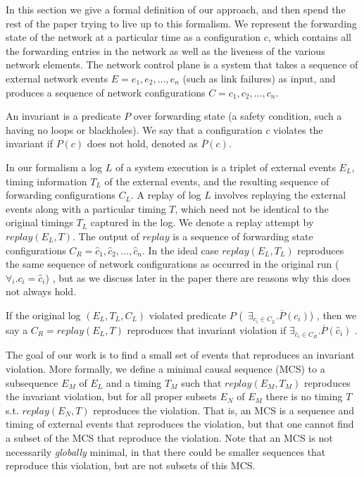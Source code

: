 In this section we give a formal definition of our approach, and then spend the rest of the paper trying to live up to this formalism.  We represent the forwarding state of the network
at a particular time as a configuration $c$, which contains all the forwarding
entries in the network
as well as the liveness of the various network elements.
The network control plane is a system that takes a sequence of
external network events $E = e_1,e_2,\dots,e_n$  (such as link failures) as input,
and produces a sequence of network configurations
$C = c_1,c_2,\dots,c_n$.

An invariant is a predicate $P$ over forwarding state (a safety
condition, such a having no loops or blackholes). We say that a configuration
$c$ violates the invariant if $P(c)$ does not
hold, denoted as $\overline{P}(c)$.

In our formalism a log $L$ of a system execution is a triplet of external events $E_L$,
timing information $T_L$ of the external events, and the resulting sequence of forwarding
configurations $C_L$.
A replay of log $L$ involves replaying the external events along with a
particular timing $T$,
which need not be identical to the original timings $T_L$  captured in the log.
We denote a replay attempt by $replay(E_L,T)$.
The output of $replay$ is a sequence of forwarding state configurations
$C_R = \hat{c}_1,\hat{c}_2,\dots,\hat{c}_n$. In the ideal case $replay(E_L,T_L)$ reproduces the same
sequence of network configurations as occurred in the original run
(\ie~$\forall_i. c_i = \hat{c}_i$) , but as we discuss later in the paper there are reasons why
this does not always hold.

If the original log $(E_L, T_L, C_L)$ violated predicate $P$
(\ie~$\exists_{c_i \in C_L}. \overline{P}(c_i)$) ,
then we say a $C_R = replay(E_L,T)$ reproduces that invariant violation if
$\exists_{\hat{c}_i \in C_R}. \overline{P}(\hat{c}_i)$ .

The goal of our work is to find a small set of events that reproduces an invariant violation.  More formally, we define a minimal causal sequence (MCS) to a subsequence $E_M$
of $E_L$ and a timing $T_M$ such
that $replay(E_M,T_M)$ reproduces the invariant violation, but for all proper
subsets $E_N$ of $E_M$
there is no timing $T$ s.t. $replay(E_N,T)$ reproduces the violation. That is, an MCS is a sequence and timing of external events that reproduces the violation, but that one cannot find a subset of the MCS that reproduce the violation.  Note that an MCS is not necessarily {\em globally} minimal, in that there could be smaller sequences that reproduce this violation, but are not subsets of this MCS.

